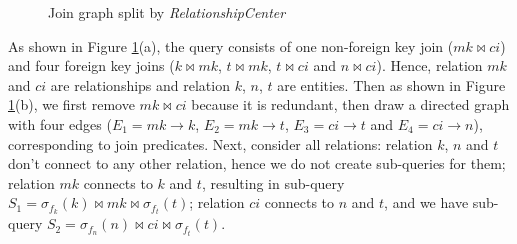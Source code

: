         \begin{figure}[htb]
            \centering
            \caption{Join graph split by \textit{RelationshipCenter}}
            \label{F6}
            \Description{}
        \end{figure}
        \begin{Example}[RelationshipCenter] \label{E4}
            As shown in Figure \ref{F6}(a), the query consists of one non-foreign key join ($mk \bowtie ci$) and four foreign key joins ($k \bowtie mk$, $t \bowtie mk$, $t \bowtie ci$ and $n \bowtie ci$). Hence, relation $mk$ and $ci$ are relationships and relation $k$, $n$, $t$ are entities. Then as shown in Figure \ref{F6}(b), we first remove $mk \bowtie ci$ because it is redundant, then draw a directed graph with four edges ($E_1=mk \rightarrow k$, $E_2=mk \rightarrow t$, $E_3=ci \rightarrow t$ and $E_4=ci \rightarrow n$), corresponding to join predicates. Next, consider all relations: relation $k$, $n$ and $t$ don't connect to any other relation, hence we do not create sub-queries for them; relation $mk$ connects to $k$ and $t$, resulting in sub-query $S_1=\sigma_{f_k}(k) \bowtie mk \bowtie \sigma_{f_t}(t)$; relation $ci$ connects to $n$ and $t$, and we have sub-query $S_2=\sigma_{f_n}(n) \bowtie ci \bowtie \sigma_{f_t}(t)$.
        \end{Example}\par
